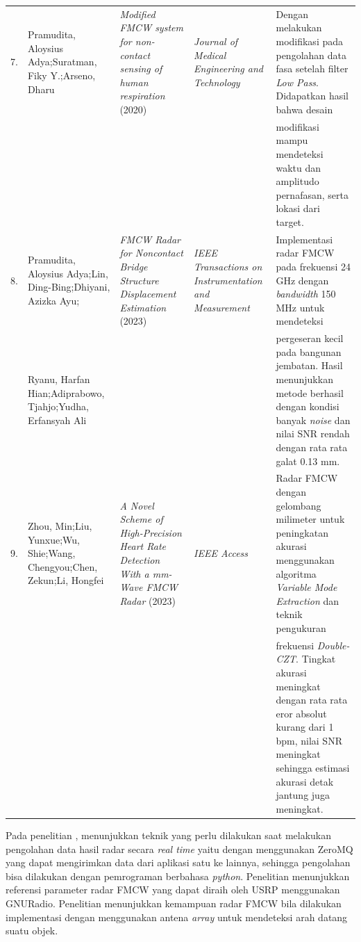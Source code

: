 \begin{center}
\begin{longtable}{|p{0.5cm}|p{2cm}|p{3cm}|p{2.5cm}|p{3cm}|}
	7. & Pramudita, Aloysius Adya;\newline Suratman, Fiky Y.;\newline Arseno, Dharu
	& \textit{Modified FMCW system for non-contact sensing of human respiration} (2020) \cite{Pramudita2020}
	& \textit{Journal of Medical Engineering and Technology}
	& Dengan melakukan modifikasi pada pengolahan data fasa setelah filter \textit{Low Pass}. Didapatkan hasil bahwa desain\\
	&
	&
	&
	&
	 modifikasi mampu mendeteksi waktu dan amplitudo pernafasan, serta lokasi dari target. 
	\\
	\hline
	8. & Pramudita, Aloysius Adya;\newline Lin, Ding-Bing;\newline Dhiyani, Azizka Ayu;
	& \textit{FMCW Radar for Noncontact Bridge Structure Displacement Estimation} (2023) \cite{Pramudita2023}
	& \textit{IEEE Transactions on Instrumentation and Measurement}
	& Implementasi radar FMCW pada frekuensi 24 GHz dengan \textit{bandwidth} 150 MHz untuk mendeteksi \\
	& Ryanu, Harfan Hian;\newline Adiprabowo, Tjahjo;\newline Yudha, Erfansyah Ali
	&
	&
	&
	pergeseran kecil pada bangunan jembatan. Hasil menunjukkan metode berhasil dengan kondisi banyak \textit{noise} dan nilai SNR rendah dengan rata rata galat 0.13 mm.
	\\ \hline
	9. & Zhou, Min;\newline Liu, Yunxue;\newline Wu, Shie;\newline Wang, Chengyou;\newline Chen, Zekun;\newline Li, Hongfei
	& \textit{A Novel Scheme of High-Precision Heart Rate Detection With a mm-Wave FMCW Radar} (2023) \cite{Zhou2023}
	& \textit{IEEE Access}
	& Radar FMCW dengan gelombang milimeter untuk peningkatan akurasi menggunakan algoritma \textit{Variable Mode Extraction} dan teknik pengukuran \\
	&
	&
	&
	&
	frekuensi \textit{Double-CZT}. Tingkat akurasi meningkat dengan rata rata eror absolut kurang dari 1 bpm, nilai SNR meningkat sehingga estimasi akurasi detak jantung juga meningkat.
	\\ \hline
	\end{longtable}
\end{center}

Pada penelitian \cite{Lenz2022}, menunjukkan teknik yang perlu dilakukan saat melakukan pengolahan data hasil radar secara \textit{real time} yaitu dengan menggunakan ZeroMQ yang dapat mengirimkan data dari aplikasi satu ke lainnya, sehingga pengolahan bisa dilakukan dengan pemrograman berbahasa \textit{python}. Penelitian \cite{Wankhede2024} menunjukkan referensi parameter radar FMCW yang dapat diraih oleh USRP menggunakan GNURadio. Penelitian \cite{HilarioRe2021} menunjukkan kemampuan radar FMCW bila dilakukan implementasi dengan menggunakan antena \textit{array} untuk mendeteksi arah datang suatu objek.

